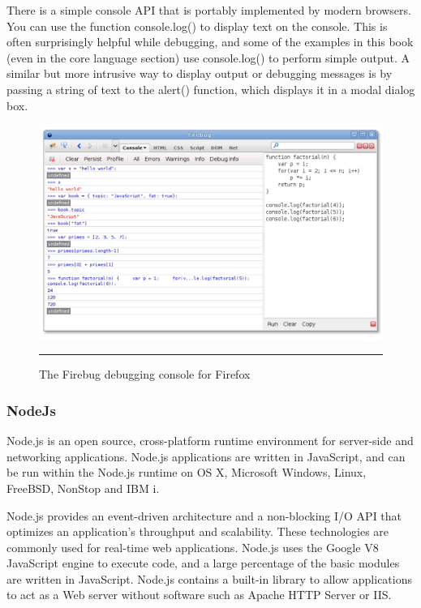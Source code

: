 There is a simple console API that is portably implemented by modern browsers. You
can use the function console.log() to display text on the console. This is often surprisingly
helpful while debugging, and some of the examples in this book (even in the
core language section) use console.log() to perform simple output. A similar but more
intrusive way to display output or debugging messages is by passing a string of text to
the alert() function, which displays it in a modal dialog box.
\begin{figure}[h!]
  \centering
    \includegraphics[width=\textwidth]{./Pictures/firebug.jpg}
  \rule{1\textwidth}{1pt}
 \caption{The Firebug debugging console for Firefox}
 \label{fig:Firebug}
\end{figure}

\subsubsection{NodeJs}
Node.js is an open source, cross-platform runtime environment for server-side and networking applications. Node.js applications are written in JavaScript, and can be run within the Node.js runtime on OS X, Microsoft Windows, Linux, FreeBSD, NonStop and IBM i.

Node.js provides an event-driven architecture and a non-blocking I/O API that optimizes an application's throughput and scalability. These technologies are commonly used for real-time web applications.
Node.js uses the Google V8 JavaScript engine to execute code, and a large percentage of the basic modules are written in JavaScript. Node.js contains a built-in library to allow applications to act as a Web server without software such as Apache HTTP Server or IIS.
\clearpage



